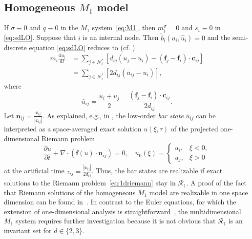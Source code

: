 \documentclass[preprint, 11pt]{elsarticle}
\newcommand{\N}{\mathcal{N}}
\newcommand{\n}{\mathbf{n}}
\newcommand{\f}{\mathbf{f}}
\newcommand{\con}{\mathbf{c}}
\newcommand{\dv}{\nabla\cdot}
\begin{document}
\subsection{Homogeneous $M_1$ model}
If $\sigma\equiv 0$ and $q\equiv 0$ in the $M_1$ system~\eqref{eq:M1},
then $m_{i}^\sigma=0$ and $s_i\equiv 0$ in \eqref{eq:sdLO}. Suppose that $i$ is an
internal node. Then
$\tilde{b}_i(u_i, \hat u_i)=0$ and the semi-discrete equation
\eqref{eq:sdLO} reduces to (cf. \cite{guermond2016,kuzmin2020,kuzmin2023})
\begin{equation}\label{eq:LOhomogene}
 \begin{split} 
     m_i\frac{\mathrm{d} u_i}{\mathrm{d} t} &= \sum_{j\in\N_i^*}[ d_{ij} (u_j -u_i) - (\f_j -\f_i)\cdot \con_{ij}]\\ 
     &= \sum_{j\in\N_i^*}[ 2d_{ij} (\overline{u}_{ij} -u_i)],
 \end{split}
\end{equation}
where
\begin{equation}\label{eq:LObarstates}
    \bar u_{ij} = \frac{u_i + u_j}{2} - \frac{(\f_j-\f_i)\cdot \con_{ij}}{2d_{ij}}.
\end{equation}
Let $\n_{ij} = \frac{\con_{ij}}{|\con_{ij}|}$.
As explained, e.g., in \cite{guermond2016}, the low-order \emph{bar state}
$\bar u_{ij}$ can be interpreted as a
space-averaged exact solution $u(\xi,\tau)$ of the projected one-dimensional Riemann problem
\begin{equation}\label{eq:1driemann}
    \frac{\partial u}{\partial t}+\dv(\f(u)\cdot \n_{ij}) = 0,\quad u_0(\xi) =\begin{cases}
        u_i, & \xi <0,\\
        u_j, & \xi >0
    \end{cases}
\end{equation}
at the artificial time $\tau_{ij} =\frac{|\con_{ij}|}{2d_{ij}}$.
Thus, the bar states are realizable if exact solutions to the Riemann problem~\eqref{eq:1driemann} stay in $\mathcal{R}_1$. A proof of the fact that Riemann solutions of the homogeneous $M_1$ model are realizable in one space dimension can be found in~\cite{coulombel2006}. In contrast to the Euler equations, for which the extension of one-dimensional analysis is straightforward~\cite{toro2013}, the multidimensional $M_1$ system requires further investigation because it is not obvious that $\mathcal{R}_1$ is an invariant set for $d\in\{2,3\}$. 
\smallskip
\end{document}
